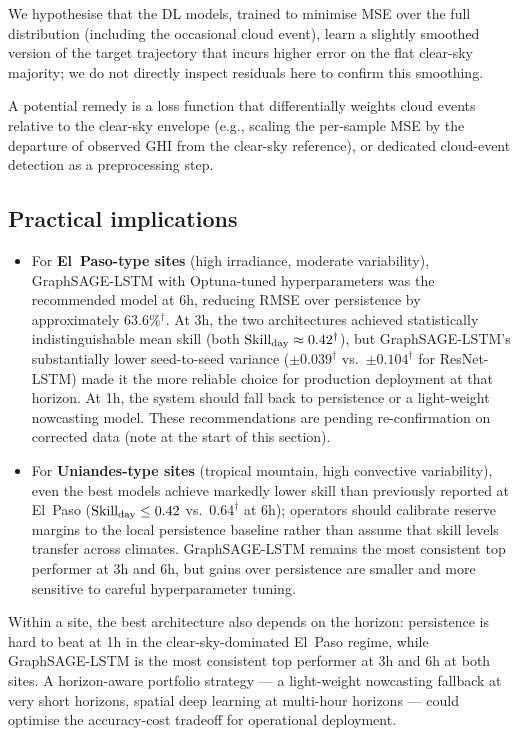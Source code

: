 We hypothesise that the DL models, trained to minimise MSE over the full
distribution (including the occasional cloud event), learn a slightly
smoothed version of the target trajectory that incurs higher error on the
flat clear-sky majority; we do not directly inspect residuals here to
confirm this smoothing.

A potential remedy is a loss function that differentially weights cloud events
relative to the clear-sky envelope (e.g., scaling the per-sample MSE by the
departure of observed GHI from the clear-sky reference), or dedicated
cloud-event detection as a preprocessing step.

\subsection{Practical implications}

\begin{itemize}
  \item For \textbf{El~Paso-type sites} (high irradiance, moderate variability),
        GraphSAGE-LSTM with Optuna-tuned hyperparameters was the recommended model
        at 6h, reducing RMSE over persistence by approximately 63.6\%$^\dagger$. At 3h, the
        two architectures achieved statistically indistinguishable mean skill
        (both $\text{Skill}_\text{day} \approx 0.42^\dagger$), but GraphSAGE-LSTM's substantially
        lower seed-to-seed variance ($\pm 0.039^\dagger$ vs.\ $\pm 0.104^\dagger$ for
        ResNet-LSTM) made it the more reliable choice for production
        deployment at that horizon. At 1h, the system should fall back to
        persistence or a light-weight nowcasting model. These recommendations
        are pending re-confirmation on corrected data (note at the start of
        this section).

  \item For \textbf{Uniandes-type sites} (tropical mountain, high convective
        variability), even the best models achieve markedly lower skill than
        previously reported at El~Paso ($\text{Skill}_\text{day} \leq 0.42$ vs.\
        $0.64^\dagger$ at 6h); operators should
        calibrate reserve margins to the local persistence baseline rather than
        assume that skill levels transfer across climates. GraphSAGE-LSTM remains
        the most consistent top performer at 3h and 6h, but gains over
        persistence are smaller and more sensitive to careful hyperparameter
        tuning.
\end{itemize}

Within a site, the best architecture also depends on the horizon: persistence
is hard to beat at 1h in the clear-sky-dominated El~Paso regime, while
GraphSAGE-LSTM is the most consistent top performer at 3h and 6h at both
sites. A horizon-aware portfolio strategy --- a light-weight nowcasting
fallback at very short horizons, spatial deep learning at multi-hour horizons
--- could optimise the accuracy-cost tradeoff for operational deployment.


